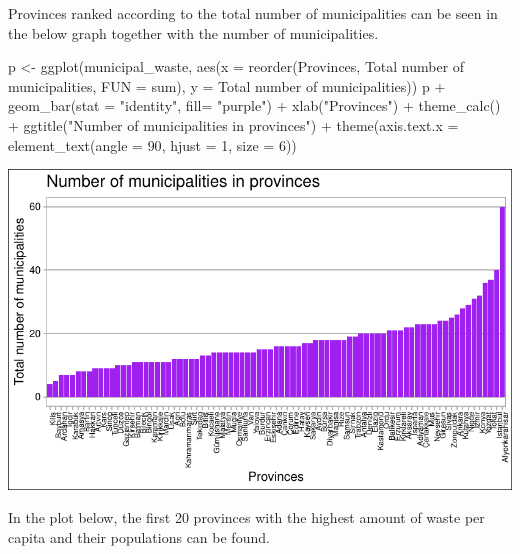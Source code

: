 \documentclass[
  11pt,
  a4paper,
  DIV=11,
  numbers=noendperiod]{scrartcl}
\newenvironment{Shaded}{\begin{snugshade}}{\end{snugshade}}
\newcommand{\AttributeTok}[1]{\textcolor[rgb]{0.40,0.45,0.13}{#1}}
\newcommand{\DecValTok}[1]{\textcolor[rgb]{0.68,0.00,0.00}{#1}}
\newcommand{\FunctionTok}[1]{\textcolor[rgb]{0.28,0.35,0.67}{#1}}
\newcommand{\NormalTok}[1]{\textcolor[rgb]{0.00,0.23,0.31}{#1}}
\newcommand{\OtherTok}[1]{\textcolor[rgb]{0.00,0.23,0.31}{#1}}
\newcommand{\SpecialCharTok}[1]{\textcolor[rgb]{0.37,0.37,0.37}{#1}}
\newcommand{\StringTok}[1]{\textcolor[rgb]{0.13,0.47,0.30}{#1}}
\begin{document}
Provinces ranked according to the total number of municipalities can be
seen in the below graph together with the number of municipalities.

\begin{Shaded}
\begin{Highlighting}[]
\NormalTok{p }\OtherTok{\textless{}{-}} \FunctionTok{ggplot}\NormalTok{(municipal\_waste, }\FunctionTok{aes}\NormalTok{(}\AttributeTok{x =} \FunctionTok{reorder}\NormalTok{(Provinces, }\StringTok{\textasciigrave{}}\AttributeTok{Total number of municipalities}\StringTok{\textasciigrave{}}\NormalTok{, }\AttributeTok{FUN =}\NormalTok{ sum), }\AttributeTok{y =} \StringTok{\textasciigrave{}}\AttributeTok{Total number of municipalities}\StringTok{\textasciigrave{}}\NormalTok{)) }
\NormalTok{p }\SpecialCharTok{+} \FunctionTok{geom\_bar}\NormalTok{(}\AttributeTok{stat =} \StringTok{"identity"}\NormalTok{, }\AttributeTok{fill=} \StringTok{"purple"}\NormalTok{) }\SpecialCharTok{+} 
  \FunctionTok{xlab}\NormalTok{(}\StringTok{"Provinces"}\NormalTok{) }\SpecialCharTok{+}
  \FunctionTok{theme\_calc}\NormalTok{() }\SpecialCharTok{+}
  \FunctionTok{ggtitle}\NormalTok{(}\StringTok{"Number of municipalities in provinces"}\NormalTok{) }\SpecialCharTok{+} 
  \FunctionTok{theme}\NormalTok{(}\AttributeTok{axis.text.x =} \FunctionTok{element\_text}\NormalTok{(}\AttributeTok{angle =} \DecValTok{90}\NormalTok{, }\AttributeTok{hjust =} \DecValTok{1}\NormalTok{, }\AttributeTok{size =} \DecValTok{6}\NormalTok{)) }
\end{Highlighting}
\end{Shaded}

\includegraphics{project_files/figure-pdf/unnamed-chunk-14-1.pdf}

In the plot below, the first 20 provinces with the highest amount of
waste per capita and their populations can be found.
\end{document}
